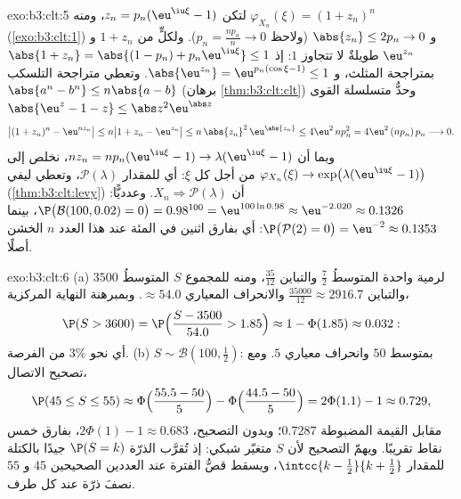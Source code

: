\begin{solution}{exo:b3:clt:5}
لتكن $z_n = p_n(\eu^{\iu\xi} - 1)$، ومنه $\varphi_{X_n}(\xi) =
(1 + z_n)^n$ (\cref{exo:b3:clt:1}) و $\abs{z_n} \leq 2p_n
\to 0$ (ولاحظ $p_n = \frac{np_n}n \to 0$).
ولكلٍّ من $1 + z_n$ و $\eu^{z_n}$ طويلةٌ لا تتجاوز $1$: إذ
$\abs{1 + z_n} =
\abs{(1 - p_n) + p_n\eu^{\iu\xi}} \leq 1$ بمتراجحة المثلث، و $\abs{\eu^{z_n}} = \eu^{p_n(\cos\xi - 1)}
\leq 1$. وتعطي متراجحة التلسكب $\abs{a^n - b^n} \leq
n\abs{a - b}$
(برهان \cref{thm:b3:clt:clt}) وحدُّ متسلسلة القوى $\abs{\eu^z - 1 - z} \leq
\abs z^2\eu^{\abs z}$
\[
\bigl|(1 + z_n)^n - \eu^{nz_n}\bigr| \leq n\bigl|1 + z_n -
\eu^{z_n}\bigr| \leq n\,\abs{z_n}^2\,\eu^{\abs{z_n}} \leq
4\eu^2\,np_n^2 = 4\eu^2\,(np_n)\,p_n \longrightarrow 0 .
\]
وبما أن $nz_n = np_n(\eu^{\iu\xi} - 1) \to
\lambda(\eu^{\iu\xi} - 1)$، نخلص إلى $\varphi_{X_n}(\xi)
\to \exp\bigl(\lambda(\eu^{\iu\xi} - 1)\bigr)$ من أجل كل $\xi$: أي  للمقدار $\mathcal P(\lambda)$، وتعطي ليفي (\cref{thm:b3:clt:levy}) أن $X_n \Rightarrow \mathcal
P(\lambda)$.
وعدديًّا: $\P\bigl(\mathcal B(100, 0.02) =
0\bigr) = 0.98^{100} = \eu^{100\ln 0.98} \approx
\eu^{-2.020} \approx 0.1326$، بينما $\P\bigl(\mathcal P(2) =
0\bigr) = \eu^{-2} \approx 0.1353$: أي بفارق اثنين في المئة عند هذا
العدد $n$ الخشن أصلًا.
\end{solution}

\begin{solution}{exo:b3:clt:6}
(a) لرمية واحدة المتوسطُ $\frac72$ والتباين $\frac{35}{12}$،
ومنه للمجموع $S$ المتوسطُ $3500$ والتباين $\frac{35000}{12} \approx 2916.7$ والانحراف المعياري
$\approx 54.0$. وبمبرهنة النهاية المركزية،
\[
\P(S > 3600) = \P\Bigl(\frac{S - 3500}{54.0} > 1.85\Bigr)
\approx 1 - \Phi(1.85) \approx 0.032 :
\]
أي نحو $3\%$ من الفرصة.
(b) $S \sim \mathcal B(100, \frac12)$: بمتوسط $50$ وانحراف معياري $5$. ومع تصحيح الاتصال،
\[
\P(45 \leq S \leq 55) \approx
\Phi\Bigl(\frac{55.5 - 50}{5}\Bigr) -
\Phi\Bigl(\frac{44.5 - 50}{5}\Bigr) = 2\Phi(1.1) - 1
\approx 0.729,
\]
مقابل القيمة المضبوطة $0.7287$؛ وبدون التصحيح، $2\Phi(1) - 1 \approx 0.683$، بفارق
خمس نقاط تقريبًا. ويهمّ التصحيح لأن $S$ متغيّر شبكي: إذ تُقرَّب
الذرّة $\P(S = k)$ جيدًا بالكتلة  للمقدار $\intcc{k - \frac12}{k + \frac12}$، ويسقط
قصُّ الفترة عند العددين الصحيحين $45$ و $55$ نصفَ ذرّة عند كل
طرف.
\end{solution}

